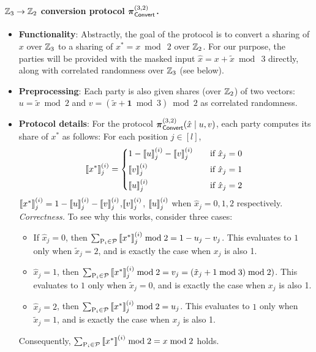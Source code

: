 \paragraph{$\mathbb{Z}_3 \to \mathbb{Z}_2$ conversion protocol $\boldsymbol{\pi}_{\textnormal{\textsf{Convert}}}^{(3,2)}$.}

\begin{itemize}
  \item \textbf{Functionality}: Abstractly, the goal of the protocol is to convert a sharing of $x$ over $\mathbb{Z}_3$ to a sharing of $x^* = x \bmod~2$ over $\mathbb{Z}_2$. For our purpose, the parties will be provided with the masked input $\hat{x} = x + \tilde{x} \bmod~3$ directly, along with correlated randomness over $\mathbb{Z}_3$ (see below).

  \item \textbf{Preprocessing}: Each party is also given shares (over $\mathbb{Z}_2$) of two vectors: $u = \tilde{x} \bmod 2$ and $v = (\tilde{x} + \textbf{1} \bmod 3) \bmod 2$ as correlated randomness.


  \item \textbf{Protocol details}: For the protocol $\boldsymbol{\pi}_{\textnormal{\textsf{Convert}}}^{(3,2)}(\hat{x} \mid u, v)$, each party computes its share of $x^*$ as follows: For each position $j \in [l]$,
\iffull
\[
\sharei{x^*}_j = 
\begin{cases*}
       1 - \sharei{u}_j - \sharei{v}_j  & \quad if $\hat{x}_j = 0$ \\
       \sharei{v}_j & \quad if $\hat{x}_j = 1$ \\
       \sharei{u}_j & \quad if $\hat{x}_j = 2$
\end{cases*}
\]
\else
$\left\llbracket x^* \right\rrbracket^{(i)}_j = 1 - \left\llbracket u \right\rrbracket^{(i)}_j - \left\llbracket v \right\rrbracket^{(i)}_j$,$\left\llbracket v \right\rrbracket^{(i)}_j$, $\left\llbracket u \right\rrbracket^{(i)}_j$ when $\hat{x}_j = 0,1,2$ respectively. \fi
\iffull
\textit{Correctness.} To see why this works, consider three cases:
\begin{itemize}
\item If $\hat{x}_j = 0$, then $\sum_{\textnormal{P}_i \in \mathcal{P}} \left\llbracket x^* \right\rrbracket^{(i)}_j \bmod 2 = 1 - u_j - v_j$. This evaluates to $1$ only when $\tilde{x}_j = 2$, and is exactly the case when $x_j$ is also 1.

\item $\hat{x}_j = 1$, then $\sum_{\textnormal{P}_i \in \mathcal{P}} \left\llbracket x^* \right\rrbracket^{(i)}_j \bmod 2 = v_j = (\tilde{x}_j + 1 \bmod 3) \bmod 2)$. This evaluates to $1$ only when $\tilde{x}_j = 0$, and is exactly the case when $x_j$ is also 1.

\item $\hat{x}_j = 2$, then $\sum_{\textnormal{P}_i \in \mathcal{P}} \left\llbracket x^* \right\rrbracket^{(i)}_j \bmod 2 = u_j$. This evaluates to $1$ only when $\tilde{x}_j = 1$, and is exactly the case when $x_j$ is also 1.
\end{itemize}
Consequently, $\sum_{\textnormal{P}_i \in \mathcal{P}} \left\llbracket x^* \right\rrbracket^{(i)} \bmod 2 = x \bmod 2$ holds.
\fi
\end{itemize}

